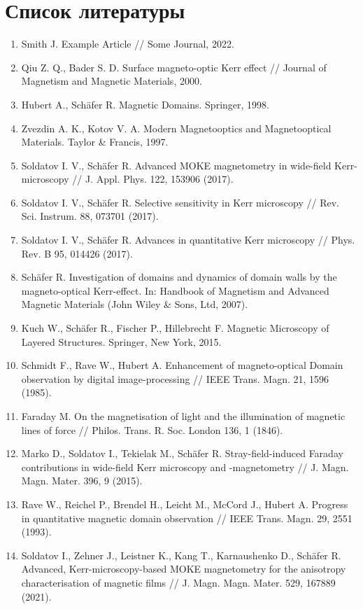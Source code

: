 \documentclass[12pt,a4paper]{article}
\numberwithin{equation}{section}
\begin{document}
\section*{Список литературы} \vspace{-4mm}
\begin{enumerate}
  \item Smith J. Example Article // Some Journal, 2022.
  \item Qiu Z. Q., Bader S. D. Surface magneto-optic Kerr effect // Journal of Magnetism and Magnetic Materials, 2000.
  \item Hubert A., Schäfer R. Magnetic Domains. Springer, 1998.
  \item Zvezdin A. K., Kotov V. A. Modern Magnetooptics and Magnetooptical Materials. Taylor \& Francis, 1997.
  \item Soldatov I. V., Schäfer R. Advanced MOKE magnetometry in wide-field Kerr-microscopy // J. Appl. Phys. 122, 153906 (2017).
  \item Soldatov I. V., Schäfer R. Selective sensitivity in Kerr microscopy // Rev. Sci. Instrum. 88, 073701 (2017).
  \item Soldatov I. V., Schäfer R. Advances in quantitative Kerr microscopy // Phys. Rev. B 95, 014426 (2017).
  \item Schäfer R. Investigation of domains and dynamics of domain walls by the magneto-optical Kerr-effect. In: Handbook of Magnetism and Advanced Magnetic Materials (John Wiley \& Sons, Ltd, 2007).
  \item Kuch W., Schäfer R., Fischer P., Hillebrecht F. Magnetic Microscopy of Layered Structures. Springer, New York, 2015.
  \item Schmidt F., Rave W., Hubert A. Enhancement of magneto-optical Domain observation by digital image-processing // IEEE Trans. Magn. 21, 1596 (1985).
  \item Faraday M. On the magnetisation of light and the illumination of magnetic lines of force // Philos. Trans. R. Soc. London 136, 1 (1846).
  \item Marko D., Soldatov I., Tekielak M., Schäfer R. Stray-field-induced Faraday contributions in wide-field Kerr microscopy and -magnetometry // J. Magn. Magn. Mater. 396, 9 (2015).
  \item Rave W., Reichel P., Brendel H., Leicht M., McCord J., Hubert A. Progress in quantitative magnetic domain observation // IEEE Trans. Magn. 29, 2551 (1993).
  \item Soldatov I., Zehner J., Leistner K., Kang T., Karnaushenko D., Schäfer R. Advanced, Kerr-microscopy-based MOKE magnetometry for the anisotropy characterisation of magnetic films // J. Magn. Magn. Mater. 529, 167889 (2021).

\end{enumerate}
\end{document}
